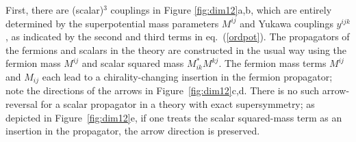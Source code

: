 \documentclass[12pt]{article}
\begin{document}
% 
First, there are (scalar)$^3$ couplings in Figure
\ref{fig:dim12}a,b, which are entirely determined by the superpotential
mass parameters $M^{ij}$ and Yukawa couplings $y^{ijk}$, as indicated by
the second and third terms in eq.~(\ref{ordpot}). The propagators of the
fermions and scalars in the theory are constructed in the usual way using
the fermion mass $M^{ij}$ and scalar squared mass $M^*_{ik}M^{kj}$. The
fermion mass terms $M^{ij}$ and $M_{ij}$ each lead to a chirality-changing
insertion in the fermion propagator; note the directions of the arrows in
Figure~\ref{fig:dim12}c,d. There is no such arrow-reversal for a scalar
propagator in a theory with exact supersymmetry; as depicted in
Figure~\ref{fig:dim12}e, if one treats the scalar squared-mass term as an
insertion in the propagator, the arrow direction is preserved. 
\end{document}
